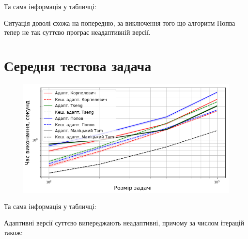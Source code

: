 Та сама інформація у табличці:





Ситуація доволі схожа на попередню, за виключення того що алгоритм Попва тепер не так суттєво програє неадаптивній версії.

\section{Середня тестова задача}

\begin{figure}[H]
    \centering
    \includegraphics[width=.75\textwidth]{img/2/adapt/time.png}
\end{figure}

Та сама інформація у табличці:



Адаптивні версії суттєво випереджають неадаптивні, причому за числом ітерацій також:


